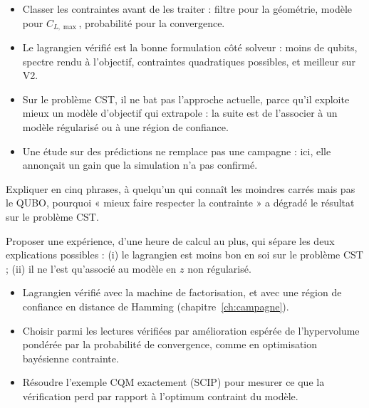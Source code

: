 \begin{resultat}
\begin{itemize}
\item Classer les contraintes avant de les traiter : filtre pour la géométrie, modèle pour $C_{L,\max}$, probabilité pour la convergence.
\item Le lagrangien vérifié est la bonne formulation côté solveur : moins de qubits, spectre rendu à l'objectif, contraintes quadratiques possibles, et meilleur sur V2.
\item Sur le problème CST, il ne bat pas l'approche actuelle, parce qu'il exploite mieux un modèle d'objectif qui extrapole : la suite est de l'associer à un modèle régularisé ou à une région de confiance.
\item Une étude sur des prédictions ne remplace pas une campagne : ici, elle annonçait un gain que la simulation n'a pas confirmé.
\end{itemize}
\end{resultat}

\exercices
\begin{exercice}\label{ex:bilan-feynman7}
Expliquer en cinq phrases, à quelqu'un qui connaît les moindres carrés mais pas le QUBO, pourquoi « mieux faire respecter la contrainte » a dégradé le résultat sur le problème CST.
\end{exercice}
\begin{exercice}\label{ex:bilan-plan}
Proposer une expérience, d'une heure de calcul au plus, qui sépare les deux explications possibles : (i) le lagrangien est moins bon en soi sur le problème CST ; (ii) il ne l'est qu'associé au modèle en $z$ non régularisé.
\end{exercice}

\begin{pistes}
\begin{itemize}
\item Lagrangien vérifié avec la machine de factorisation, et avec une région de confiance en distance de Hamming (chapitre~\ref{ch:campagne}).
\item Choisir parmi les lectures vérifiées par amélioration espérée de l'hypervolume pondérée par la probabilité de convergence, comme en optimisation bayésienne contrainte.
\item Résoudre l'exemple CQM exactement (SCIP) pour mesurer ce que la vérification perd par rapport à l'optimum contraint du modèle.
\end{itemize}
\end{pistes}
